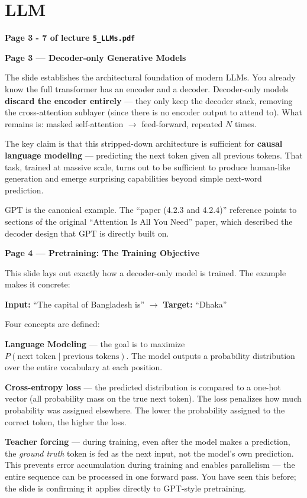 \section{LLM}

\textbf{Page 3 - 7 of lecture \texttt{5\_LLMs.pdf}}

\medskip

\textbf{Page 3 --- Decoder-only Generative Models}

The slide establishes the architectural foundation of modern LLMs. You already know the full transformer has an encoder and a decoder. Decoder-only models \textbf{discard the encoder entirely} --- they only keep the decoder stack, removing the cross-attention sublayer (since there is no encoder output to attend to). What remains is: masked self-attention $\rightarrow$ feed-forward, repeated $N$ times.

The key claim is that this stripped-down architecture is sufficient for \textbf{causal language modeling} --- predicting the next token given all previous tokens. That task, trained at massive scale, turns out to be sufficient to produce human-like generation and emerge surprising capabilities beyond simple next-word prediction.

GPT is the canonical example. The ``paper (4.2.3 and 4.2.4)'' reference points to sections of the original ``Attention Is All You Need'' paper, which described the decoder design that GPT is directly built on.

\medskip

\textbf{Page 4 --- Pretraining: The Training Objective}

This slide lays out exactly how a decoder-only model is trained. The example makes it concrete:

\textbf{Input:} ``The capital of Bangladesh is'' $\rightarrow$ \textbf{Target:} ``Dhaka''

Four concepts are defined:

\textbf{Language Modeling} --- the goal is to maximize $P(\text{next token} \mid \text{previous tokens})$. The model outputs a probability distribution over the entire vocabulary at each position.

\textbf{Cross-entropy loss} --- the predicted distribution is compared to a one-hot vector (all probability mass on the true next token). The loss penalizes how much probability was assigned elsewhere. The lower the probability assigned to the correct token, the higher the loss.

\textbf{Teacher forcing} --- during training, even after the model makes a prediction, the \textit{ground truth} token is fed as the next input, not the model's own prediction. This prevents error accumulation during training and enables parallelism --- the entire sequence can be processed in one forward pass. You have seen this before; the slide is confirming it applies directly to GPT-style pretraining.

